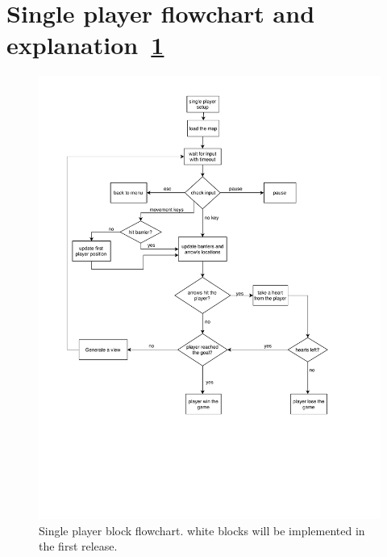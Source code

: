 \section{Single player flowchart and explanation~\ref{fig:singleplayer}}

\begin{figure}
    \centering 
    \includegraphics[width=\columnwidth]{singleplayer.pdf}
    \caption{Single player block flowchart. white blocks will be implemented in the first release.}
    \label{fig:singleplayer}
\end{figure}

